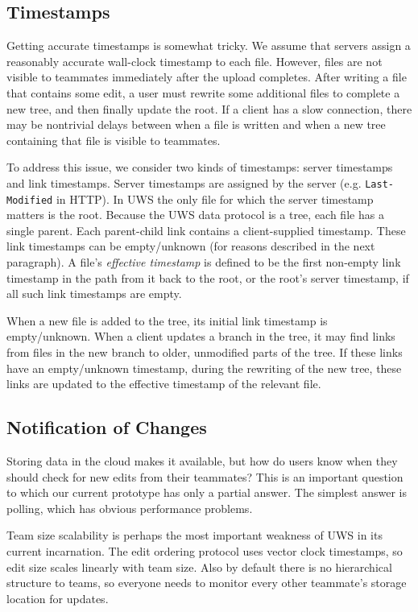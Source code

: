 \documentclass[runningheads]{llncs}
\begin{document}
\subsection{Timestamps}

Getting accurate timestamps is somewhat tricky.
We assume that servers assign a reasonably accurate wall-clock timestamp to each file.
However, files are not visible to teammates immediately after the upload completes.
After writing a file that contains some edit, a user must rewrite some additional files to complete a new tree, and then finally update the root.
If a client has a slow connection, there may be nontrivial delays between when a file is written and when a new tree containing that file is visible to teammates.

To address this issue, we consider two kinds of timestamps: server timestamps and link timestamps.
Server timestamps are assigned by the server (e.g. \texttt{Last-Modified} in HTTP).
In UWS the only file for which the server timestamp matters is the root.
Because the UWS data protocol is a tree, each file has a single parent.
Each parent-child link contains a client-supplied timestamp.
These link timestamps can be empty{\slash}unknown (for reasons described in the next paragraph).
A file's \emph{effective timestamp} is defined to be the first non-empty link timestamp in the path from it back to the root, or the root's server timestamp, if all such link timestamps are empty.

When a new file is added to the tree, its initial link timestamp is empty{\slash}unknown.
When a client updates a branch in the tree, it may find links from files in the new branch to older, unmodified parts of the tree.
If these links have an empty{\slash}unknown timestamp, during the rewriting of the new tree, these links are updated to the effective timestamp of the relevant file.

\subsection{Notification of Changes}

Storing data in the cloud makes it available, but how do users know when they should check for new edits from their teammates?
This is an important question to which our current prototype has only a partial answer.
The simplest answer is polling, which has obvious performance problems.

Team size scalability is perhaps the most important weakness of UWS in its current incarnation.
The edit ordering protocol uses vector clock timestamps, so edit size scales linearly with team size.
Also by default there is no hierarchical structure to teams, so everyone needs to monitor every other teammate's storage location for updates.
\end{document}
